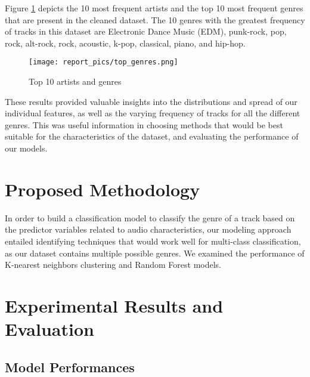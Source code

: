 \documentclass[times, twocolumn]{article}
\begin{document}
Figure \ref{top10} depicts the 10 most frequent artists and the top 10 most frequent genres that are present in the cleaned dataset. The 10 genres with the greatest frequency of tracks in this dataset are Electronic Dance Music (EDM), punk-rock, pop, rock, alt-rock, rock, acoustic, k-pop, classical, piano, and hip-hop. 

\begin{figure}[H]
    \centering
    \texttt{[image: report\_pics/top\_genres.png]}
    \caption{Top 10 artists and genres}
    \label{top10}
\end{figure}

These results provided valuable insights into the distributions and spread of our individual features, as well as the varying frequency of tracks for all the different genres. This was useful information in choosing methods that would be best suitable for the characteristics of the dataset, and evaluating the performance of our models.

\section{Proposed Methodology}
In order to build a classification model to classify the genre of a track based on the predictor variables related to audio characteristics, our modeling approach entailed identifying techniques that would work well for multi-class classification, as our dataset contains multiple possible genres. We examined the performance of K-nearest neighbors clustering and Random Forest models.

\section{Experimental Results and Evaluation}
\subsection{Model Performances}
\end{document}
